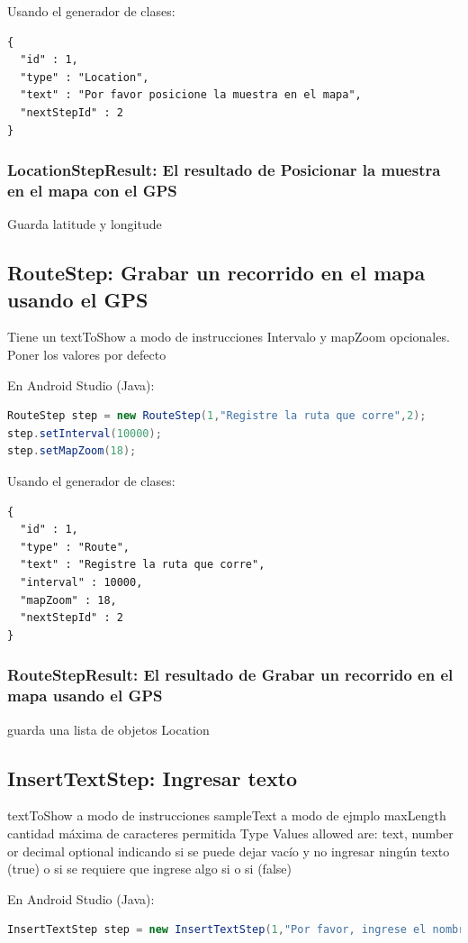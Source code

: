 Usando el generador de clases:
\begin{lstlisting}[language=XML, frame=tlb]	
{
  "id" : 1,
  "type" : "Location",
  "text" : "Por favor posicione la muestra en el mapa",
  "nextStepId" : 2
}
\end{lstlisting}

\subsubsection{LocationStepResult: El resultado de Posicionar la muestra en el mapa con el GPS}
Guarda latitude y longitude

\subsection{RouteStep: Grabar un recorrido en el mapa usando el GPS}
Tiene un textToShow a modo de instrucciones
Intervalo y mapZoom opcionales. Poner los valores por defecto

En Android Studio (Java):
\begin{lstlisting}[language=Java, frame=tlb]	
RouteStep step = new RouteStep(1,"Registre la ruta que corre",2); 
step.setInterval(10000);
step.setMapZoom(18);
\end{lstlisting}

Usando el generador de clases:
\begin{lstlisting}[language=XML, frame=tlb]	
{
  "id" : 1,
  "type" : "Route",
  "text" : "Registre la ruta que corre",
  "interval" : 10000,
  "mapZoom" : 18,
  "nextStepId" : 2
}
\end{lstlisting}

\subsubsection{RouteStepResult: El resultado de Grabar un recorrido en el mapa usando el GPS}
guarda una lista de objetos Location

\subsection{InsertTextStep: Ingresar texto}
textToShow a modo de instrucciones
sampleText a modo de ejmplo
maxLength cantidad máxima de caracteres permitida
Type Values allowed are: text, number or decimal
optional indicando si se puede dejar vacío y no ingresar ningún texto (true) o si se requiere que ingrese algo si o si (false)


En Android Studio (Java):
\begin{lstlisting}[language=Java, frame=tlb]	
InsertTextStep step = new InsertTextStep(1,"Por favor, ingrese el nombre del lago","Nombre del lago",50,InsertTextStep.InputType.TYPE_TEXT,true,2);
\end{lstlisting}

